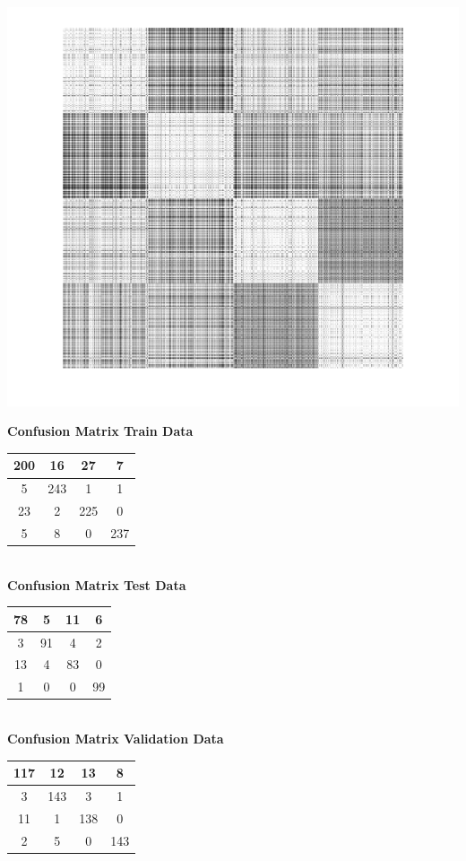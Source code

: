 \documentclass{article}
\begin{document}
\begin{center}
\includegraphics[scale=1]{Classification/1c/nu_g/kgm}
\end{center}
\begin{flushleft}
\textbf{Confusion Matrix Train Data\\[5pt]}
\begin{tabular}{|c|c|c|c|}
\hline
200 & 16 & 27 & 7 \\
\hline
5 & 243 & 1 & 1 \\
\hline
23 & 2 & 225 & 0 \\
\hline
5 & 8 & 0 & 237 \\
\hline
\end{tabular}
\textbf{\\[10pt] Confusion Matrix Test Data \\[5pt]}
\begin{tabular}{|c|c|c|c|}
\hline
78 & 5 & 11 & 6 \\
\hline
3 & 91 & 4 & 2 \\
\hline
13 & 4 & 83 & 0 \\
\hline
1 & 0 & 0 & 99 \\
\hline
\end{tabular}
\textbf{\\[10pt] Confusion Matrix Validation Data \\[5pt]}
\begin{tabular}{|c|c|c|c|}
\hline
117 & 12 & 13 & 8 \\
\hline
3 & 143 & 3 & 1 \\
\hline
11 & 1 & 138 & 0 \\
\hline
2 & 5 & 0 & 143 \\
\hline
\end{tabular}
\end{flushleft}
\end{document}
